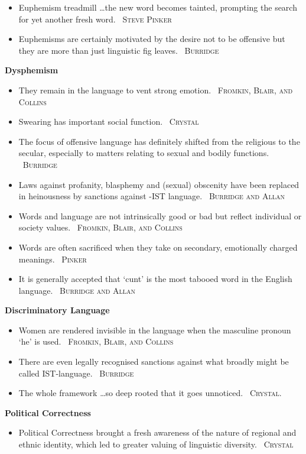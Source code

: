 \documentclass[a4paper]{article}
\newcommand{\heading}[1]{\textbf{#1}}
\newcommand{\linguist}[1]{\textemdash~\textsc{#1}}
\begin{document}
\begin{multicols}{2}
\begin{itemize}
    \item Euphemism treadmill \dots the new word becomes tainted, prompting the search for yet another fresh word. \linguist{Steve Pinker}
    \item Euphemisms are certainly motivated by the desire not to be offensive but they are more than just linguistic fig leaves. \linguist{Burridge}
  \end{itemize}
  \heading{Dysphemism}
  \begin{itemize}
    \item They remain in the language to vent strong emotion. \linguist{Fromkin, Blair, and Collins}
    \item Swearing has important social function. \linguist{Crystal}
    \item The focus of offensive language has definitely shifted from the religious to the secular, especially to matters relating to sexual and bodily functions. \linguist{Burridge}
    \item Laws against profanity, blasphemy and (sexual) obscenity have been replaced in heinousness by sanctions against -IST language. \linguist{Burridge and Allan}
    \item Words and language are not intrinsically good or bad but reflect individual or society values. \linguist{Fromkin, Blair, and Collins}
    \item Words are often sacrificed when they take on secondary, emotionally charged meanings. \linguist{Pinker}
    \item It is generally accepted that `cunt' is the most tabooed word in the English language. \linguist{Burridge and Allan}
  \end{itemize}
  \heading{Discriminatory Language}
  \begin{itemize}
    \item Women are rendered invisible in the language when the masculine pronoun `he' is used. \linguist{Fromkin, Blair, and Collins}
    \item There are even legally recognised sanctions against what broadly might be called IST-language. \linguist{Burridge}
    \item The whole framework \dots so deep rooted that it goes unnoticed. \linguist{Crystal.}
  \end{itemize}
  \heading{Political Correctness}
  \begin{itemize}
    \item Political Correctness brought a fresh awareness of the nature of regional and ethnic identity, which led to greater valuing of linguistic diversity. \linguist{Crystal}

\end{itemize}
\end{multicols}
\end{document}

